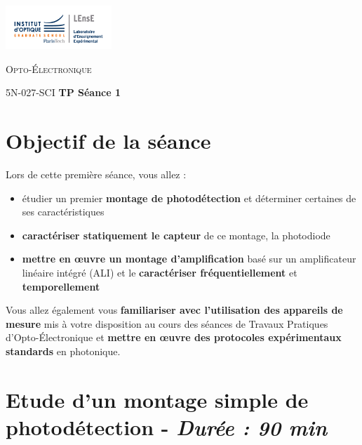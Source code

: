 \newpage

\begin{minipage}[c]{.25\linewidth}
	\includegraphics[width=4cm]{images/Logo-LEnsE.png}
\end{minipage} \hfill
\begin{minipage}[c]{.4\linewidth}

\begin{center}
\vspace{0.3cm}
{\Large \textsc{Opto-Électronique}}

\medskip

5N-027-SCI \qquad \textbf{\Large TP Séance 1}

\end{center}
\end{minipage}\hfill

\section{Objectif de la séance}

Lors de cette première séance, vous allez :

\begin{itemize}
	\item étudier un premier \textbf{montage de photodétection} et déterminer certaines de ses caractéristiques
	\item \textbf{caractériser statiquement le capteur} de ce montage, la photodiode
	\item \textbf{mettre en \oe{}uvre un montage d'amplification} basé sur un amplificateur linéaire intégré (ALI) et le \textbf{caractériser fréquentiellement} et \textbf{temporellement}
\end{itemize} 

\medskip

Vous allez également vous \textbf{familiariser avec l'utilisation des appareils de mesure} mis à
votre disposition au cours des séances de Travaux Pratiques d'Opto-Électronique et \textbf{mettre en \oe{}uvre des protocoles expérimentaux standards} en photonique.

\section{Etude d'un montage simple de photodétection - \textit{Durée : 90 min}}

